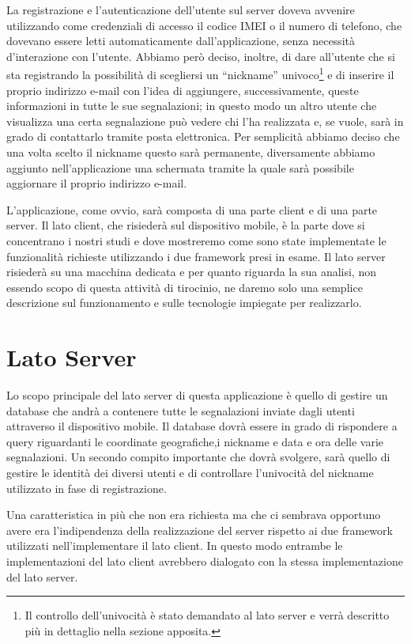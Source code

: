     \noindent La registrazione e l'autenticazione dell'utente sul server doveva avvenire
    utilizzando come credenziali di accesso il codice IMEI o il numero di
    telefono, che dovevano essere letti automaticamente dall'applicazione,
    senza necessità d'interazione con l'utente. Abbiamo però deciso, inoltre, di
    dare all'utente che si sta registrando la possibilità di scegliersi un
    ``nickname'' univoco\footnote{Il controllo dell'univocità è stato demandato
    al lato server e verrà descritto più in dettaglio nella sezione apposita.}
    e di inserire il proprio indirizzo e-mail con l'idea di aggiungere,
    successivamente, queste informazioni in tutte le sue segnalazioni; in questo
    modo un altro utente che visualizza una certa segnalazione può vedere chi
    l'ha realizzata e, se vuole, sarà in grado di contattarlo tramite posta
    elettronica. Per semplicità abbiamo deciso che una volta scelto il nickname
    questo sarà permanente, diversamente abbiamo aggiunto nell'applicazione una
    schermata tramite la quale sarà possibile aggiornare il proprio indirizzo
    e-mail.

    L'applicazione, come ovvio, sarà composta di una parte client e di una parte
    server. Il lato client, che risiederà sul dispositivo mobile, è la parte dove
    si concentrano i nostri studi e dove
    mostreremo come sono state implementate le funzionalità richieste
    utilizzando i due frame\-work presi in esame. Il lato server risiederà
    su una macchina dedicata e per quanto riguarda la sua analisi, non
    essendo scopo di questa attività di tirocinio, ne daremo solo una
    semplice descrizione sul funzionamento e sulle tecnologie
    impiegate per realizzarlo.

    \section{Lato Server}
        Lo scopo principale del lato server di questa applicazione è quello di
        gestire un database che andrà a contenere tutte le segnalazioni inviate
        dagli utenti attraverso il dispositivo mobile. Il
        database dovrà essere in grado di rispondere a query riguardanti
        le coordinate geografiche,i nickname e data e
        ora delle varie segnalazioni. Un secondo compito importante che dovrà
        svolgere, sarà quello di gestire le identità dei diversi utenti e di
        controllare l'univocità del nickname utilizzato in fase di
        registrazione.

        Una caratteristica in più che non era richiesta ma che ci sembrava
        opportuno avere era l'indipendenza della realizzazione del server
        rispetto ai due frame\-work utilizzati nell'implementare il lato client.
        In questo modo entrambe le implementazioni del lato client avrebbero
        dialogato con la stessa implementazione del lato server.

